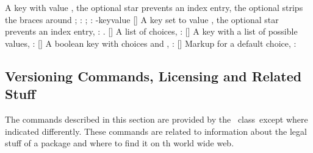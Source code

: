 \documentclass[load-preamble]{cnltx-doc}
\begin{document}
\begin{commands}
    A key  with value , the optional star prevents an
    index entry, the  optional \code{-} strips the braces around ;
    : ;
    \code{-}: \key-{key}{value}
  [\sarg{}]
    A key  set to value , the
    optional star prevents an index entry, :
    .
  []
    A list of choices, :
  []
    A key  with a list of possible values,
    :
  []
    A boolean key  with choices  and ,
    : 
  []
    Markup for a default choice,
    :
\end{commands}


\subsection{Versioning Commands, Licensing and Related  Stuff}\label{sec:cmds:versioning}

The commands described in this section are provided by the \cnltx\
class\byclass\ except where indicated differently.  These commands are related
to information about the legal stuff of a package and where to find it on th
world wide web.
\end{document}
